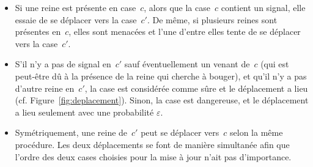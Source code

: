 \documentclass[11pt, openany, a4paper]{article}
\begin{document}
\begin{itemize}

\item{ Si une reine est présente en case~$c$, alors que la case~$c$ contient un signal, elle essaie de se déplacer vers la case~$c'$. De même, si plusieurs reines sont présentes en~$c$, elles sont menacées et l'une d'entre elles tente de se déplacer vers la case~$c'$.}

\item{ S'il n'y a pas de signal en~$c'$ sauf éventuellement un venant de~$c$ (qui est peut-être dû à la présence de la reine qui cherche à bouger), et qu'il n'y a pas d'autre reine en~$c'$, la case est considérée comme sûre et le déplacement a lieu (cf. Figure~\ref{fig:deplacement}). Sinon, la case est dangereuse, et le déplacement a lieu seulement avec une probabilité $\varepsilon$.
}

\item{ Symétriquement, une reine de~$c'$ peut se déplacer vers~$c$ selon la même procédure. Les deux déplacements se font de manière simultanée afin que l'ordre des deux cases choisies pour la mise à jour n'ait pas d'importance.}

\end{itemize}

\end{document}
